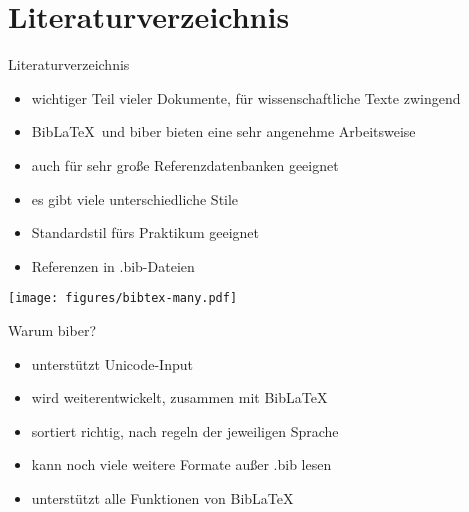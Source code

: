 \section{Literaturverzeichnis}

\begin{frame}{Literaturverzeichnis}
  \begin{itemize}
    \item wichtiger Teil vieler Dokumente, für wissenschaftliche Texte zwingend
    \item Bib\LaTeX\ und biber bieten eine sehr angenehme Arbeitsweise
    \item auch für sehr große Referenzdatenbanken geeignet
    \item es gibt viele unterschiedliche Stile
    \item Standardstil fürs Praktikum geeignet
    \item Referenzen in .bib-Dateien
  \end{itemize}
\end{frame}

\begin{frame}
  \centering
  \texttt{[image: figures/bibtex-many.pdf]}
\end{frame}

\begin{frame}{Warum biber?}
  \begin{itemize}
    \item unterstützt Unicode-Input
    \item wird weiterentwickelt, zusammen mit Bib\LaTeX
    \item sortiert richtig, nach regeln der jeweiligen Sprache
    \item kann noch viele weitere Formate außer .bib lesen
    \item unterstützt alle Funktionen von Bib\LaTeX
  \end{itemize}
\end{frame}


